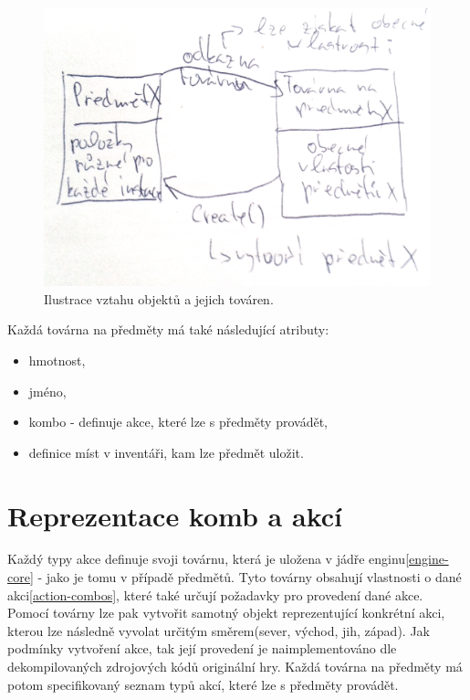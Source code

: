 \begin{figure}[H]\centering
\includegraphics[width=\textwidth]{./img/item-factories.png}
\caption{Ilustrace vztahu objektů a jejich továren.}
\label{item-factories}
\end{figure}

Každá továrna na předměty má také následující atributy:
\begin{itemize}
\item hmotnost, 
\item jméno, 
\item kombo - definuje akce, které lze s předměty provádět,  
\item definice míst v inventáři, kam lze předmět uložit. 
\end{itemize}

\section{Reprezentace komb a akcí}
Každý typy akce definuje svoji továrnu, která je uložena v jádře enginu\vref{engine-core} - jako je tomu v případě předmětů.
Tyto továrny obsahují vlastnosti o dané akci\vref{action-combos}, které také určují požadavky pro provedení dané akce.
Pomocí továrny lze pak vytvořit samotný objekt reprezentující konkrétní akci, kterou lze následně vyvolat určitým 
směrem(sever, východ, jih, západ). Jak podmínky vytvoření akce, tak její provedení je naimplementováno dle dekompilovaných
zdrojových kódů\cite{DMDecompilation} originální hry. Každá továrna na předměty má potom specifikovaný seznam typů akcí,
které lze s předměty provádět.

